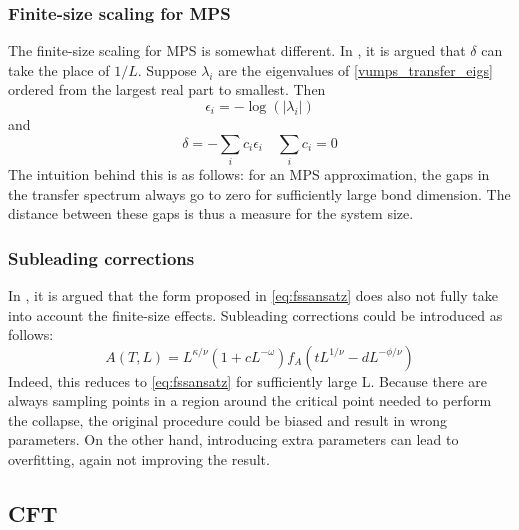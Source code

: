 \subsubsection{Finite-size scaling for MPS}

The finite-size scaling for \Gls{MPS} is somewhat different. In \cite{Vanhecke2019}, it is argued that $\delta$ can take the place of $1/L$. Suppose $\lambda_i$ are the eigenvalues of \cref{vumps_transfer_eigs} ordered from the largest real part to smallest. Then
\begin{equation}
  \epsilon_i = - \log( \left | \lambda_i  \right |  )
\end{equation}
and
\begin{equation} \label{eq:cit_delta}
  \delta = - \sum_i c_i \epsilon_i  \quad \sum_i c_i = 0
\end{equation}
The intuition behind this is as follows: for an \Gls{MPS} approximation, the gaps in the transfer spectrum always go to zero for sufficiently large bond dimension. The distance between these gaps is thus a measure for the system size.

\subsubsection{Subleading corrections}
In \cite{Beach2005}, it is argued that the form proposed in \cref{eq:fssansatz} does also not fully take into account the finite-size effects. Subleading corrections could be introduced as follows:
\begin{equation}\label{ea:subleadparam}
  A(T,L) = L^{\kappa / \nu} ( 1+c L^{-\omega} ) f_A( t L ^{1/ \nu} -d L^{-\phi/\nu} )
\end{equation}
Indeed, this reduces to \cref{eq:fssansatz} for sufficiently large L. Because there are always sampling points in a region around the critical point needed to perform the collapse, the original procedure could be biased and result in wrong parameters. On the other hand, introducing extra parameters can lead to overfitting, again not improving the result.

\subsection{CFT}\label{crit:cft}

